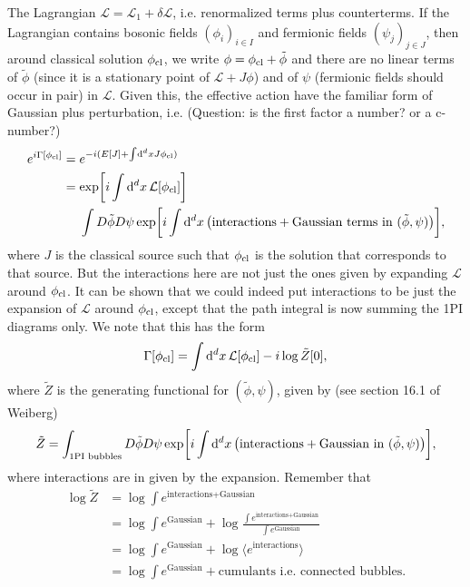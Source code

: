 \documentclass{article}
\begin{document}
The Lagrangian $\mathcal{L} = \mathcal{L}_1 + \delta\mathcal{L}$, i.e. renormalized terms plus counterterms.
If the Lagrangian contains bosonic fields $(\phi_i)_{i\in I}$ and fermionic fields $(\psi_j)_{j\in J}$, then around classical solution $\phi_{\textnormal{cl}}$, we write $\phi = \phi_{\textnormal{cl}} + \tilde{\phi}$ and there are no linear terms of $\tilde{\phi}$ (since it is a stationary point of $\mathcal{L} + J\phi$) and of $\psi$ (fermionic fields should occur in pair) in $\mathcal{L}$.
Given this, the effective action have the familiar form of Gaussian plus perturbation, i.e. ({\color{red}Question: is the first factor a number? or a c-number?})
\begin{align*}
    e^{i\Gamma[\phi_{\textnormal{cl}}]} &= e^{-i(E[J] + \int \dd[d]{x} J\phi_{\textnormal{cl}})} \\
    &= \exp[i\int \dd[d]{x} \mathcal{L}[\phi_{\textnormal{cl}}]] \\
    &\phantom{{}={}} \int D\tilde{\phi} D\psi \exp[i\int \dd[d]{x}\qty(\text{interactions} + \text{Gaussian terms in }(\tilde{\phi},\psi))],
\end{align*}
where $J$ is the classical source such that $\phi_{\textnormal{cl}}$ is the solution that corresponds to that source.
But the interactions here are not just the ones given by expanding $\mathcal{L}$ around $\phi_{\textnormal{cl}}$.
It can be shown that we could indeed put interactions to be just the expansion of $\mathcal{L}$ around $\phi_{\textnormal{cl}}$, except that the path integral is now summing the 1PI diagrams only.
We note that this has the form
\[ \Gamma[\phi_{\textnormal{cl}}] = \int \dd[d]{x} \mathcal{L}[\phi_{\textnormal{cl}}] -i\log \tilde{Z}[0], \]
where $\tilde{Z}$ is the generating functional for $(\tilde{\phi},\psi)$, given by (see section 16.1 of Weiberg)
\[ \tilde{Z} = \int_{\text{1PI bubbles}} D\tilde{\phi} D\psi \exp[i\int \dd[d]{x}\qty(\text{interactions} + \text{Gaussian in }(\tilde{\phi},\psi))], \]
where interactions are in given by the expansion.
Remember that
\begin{align*}
    \log \tilde{Z} &= \log \int e^{\text{interactions} + \text{Gaussian}} \\
    &= \log \int e^{\text{Gaussian}} + \log \frac{\int e^{\text{interactions} + \text{Gaussian}}}{\int e^{\text{Gaussian}}} \\
    &= \log \int e^{\text{Gaussian}} + \log \langle e^{\text{interactions}} \rangle \\
    &= \log \int e^{\text{Gaussian}} + \text{cumulants i.e. connected bubbles}.
\end{align*}
\end{document}
